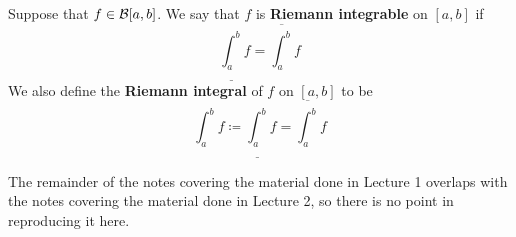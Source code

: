 \begin{defn}
  Suppose that $f \in \mathcal{B}[a, b]$. We say that $f$ is \textbf{Riemann integrable} on $[a, b]$ if
  \[
    \underline{\int_a^b} f = \overline{\int_a^b} f
  \]
  We also define the \textbf{Riemann integral} of $f$ on $[a, b]$ to be
  \[
    \int_a^b f \coloneqq \underline{\int_a^b} f = \overline{\int_a^b} f
  \]
\end{defn}

The remainder of the notes covering the material done in Lecture 1 overlaps with the notes covering the material done in Lecture 2, so there is no point in reproducing it here.

